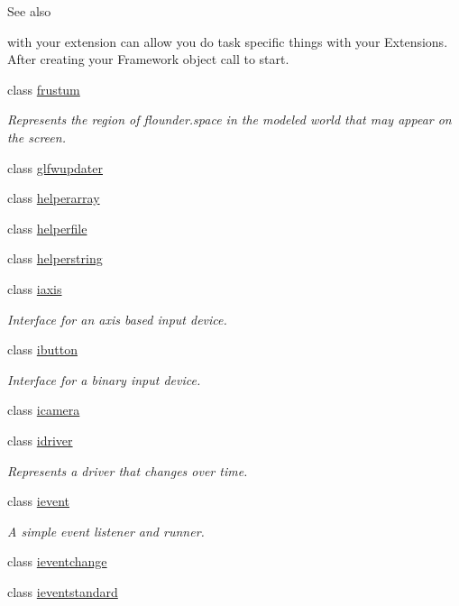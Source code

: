 \begin{DoxyCompactItemize}
\begin{DoxyCompactList}
\begin{DoxySeeAlso}{See also}
\end{DoxySeeAlso}
with your extension can allow you do task specific things with your Extensions. After creating your Framework object call  to start. \end{DoxyCompactList}\item 
class \hyperlink{classflounder_1_1frustum}{frustum}
\begin{DoxyCompactList}\small\item\em Represents the region of flounder.\+space in the modeled world that may appear on the screen. \end{DoxyCompactList}\item 
class \hyperlink{classflounder_1_1glfwupdater}{glfwupdater}
\item 
class \hyperlink{classflounder_1_1helperarray}{helperarray}
\item 
class \hyperlink{classflounder_1_1helperfile}{helperfile}
\item 
class \hyperlink{classflounder_1_1helperstring}{helperstring}
\item 
class \hyperlink{classflounder_1_1iaxis}{iaxis}
\begin{DoxyCompactList}\small\item\em Interface for an axis based input device. \end{DoxyCompactList}\item 
class \hyperlink{classflounder_1_1ibutton}{ibutton}
\begin{DoxyCompactList}\small\item\em Interface for a binary input device. \end{DoxyCompactList}\item 
class \hyperlink{classflounder_1_1icamera}{icamera}
\item 
class \hyperlink{classflounder_1_1idriver}{idriver}
\begin{DoxyCompactList}\small\item\em Represents a driver that changes over time. \end{DoxyCompactList}\item 
class \hyperlink{classflounder_1_1ievent}{ievent}
\begin{DoxyCompactList}\small\item\em A simple event listener and runner. \end{DoxyCompactList}\item 
class \hyperlink{classflounder_1_1ieventchange}{ieventchange}
\item 
class \hyperlink{classflounder_1_1ieventstandard}{ieventstandard}

\end{DoxyCompactItemize}
